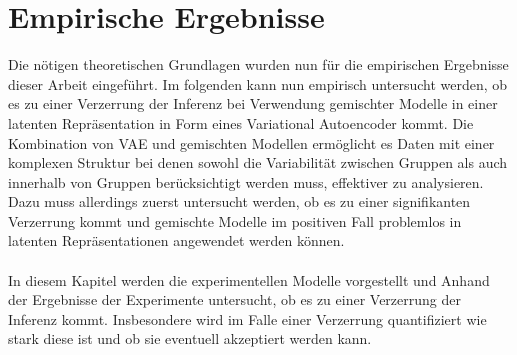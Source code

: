 \documentclass[%
thesis=student,%
coverpage=false,%
titlepage=false,%
headmarks=true, %
german,%
font=libertine, %
math=newpxtx, %
BCOR=5mm,%
coverBCOR=11mm%
]{tumbook}
\theoremstyle{break}
\begin{document}
\chapter{Empirische Ergebnisse}
Die nötigen theoretischen Grundlagen wurden nun für die empirischen Ergebnisse dieser Arbeit eingeführt. Im folgenden kann nun empirisch untersucht werden, ob es zu einer Verzerrung der Inferenz bei Verwendung gemischter Modelle in einer latenten Repräsentation in Form eines Variational Autoencoder kommt. Die Kombination von VAE und gemischten Modellen ermöglicht es Daten mit einer komplexen Struktur bei denen sowohl die Variabilität zwischen Gruppen als auch innerhalb von Gruppen berücksichtigt werden muss, effektiver zu analysieren. Dazu muss allerdings zuerst untersucht werden, ob es zu einer signifikanten Verzerrung kommt und gemischte Modelle im positiven Fall problemlos in latenten Repräsentationen angewendet werden können.\\
\\
In diesem Kapitel werden die experimentellen Modelle vorgestellt und Anhand der Ergebnisse der Experimente untersucht, ob es zu einer Verzerrung der Inferenz kommt. Insbesondere wird im Falle einer Verzerrung quantifiziert wie stark diese ist und ob sie eventuell akzeptiert werden kann.\\
\end{document}

